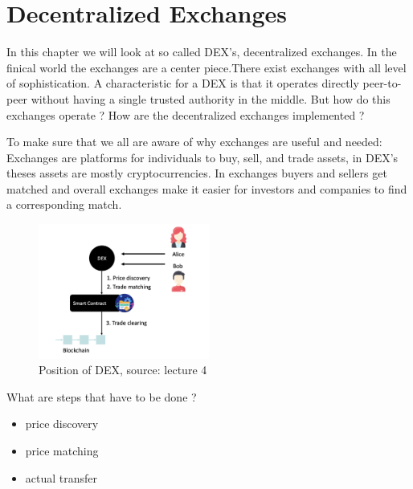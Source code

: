 \documentclass{article}
\begin{document}
\section{Decentralized Exchanges}
In this chapter we will look at so called DEX's, decentralized exchanges. In the finical world the exchanges are a center piece.There exist exchanges with all level of sophistication. A characteristic for a DEX is that it operates directly peer-to-peer without having a single trusted authority in the middle. But how do this exchanges operate ? How are the decentralized exchanges implemented ?

To make sure that we all are aware of why exchanges are useful and needed: Exchanges are platforms for individuals to buy, sell, and trade assets, in DEX's theses assets are mostly cryptocurrencies. In exchanges buyers and sellers get matched and overall exchanges make it easier for investors and companies to find a corresponding match.
\begin{figure}[h]
    \centering
    \includegraphics[width=0.5\textwidth]{Bildschirmfoto 2024-04-02 um 13.49.50.png} %
    \caption{Position of DEX, \scriptsize{source: lecture 4}}
    \label{fig:DoS-attack}
\end{figure}

What are steps that have to be done ?
\begin{itemize}
    \item {price discovery}
    \item {price matching}
    \item {actual transfer}
\end{itemize}
\end{document}
